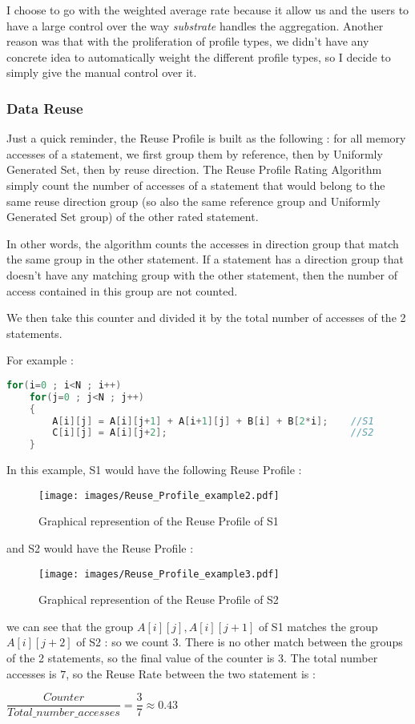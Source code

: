 \documentclass[paper=a4, fontsize=11.5pt]{scrartcl}
\numberwithin{equation}{section}        %
\numberwithin{figure}{section}          %
\numberwithin{table}{section}               %
\begin{document}
    I choose to go with the weighted average rate because it allow us and the users
    to have a large control over the way \textit{substrate} handles the aggregation.
    Another reason was that with the proliferation of profile types, we didn't have
    any concrete idea to automatically weight the different profile types, so I decide
    to simply give the manual control over it.
        \subsubsection{Data Reuse}
            Just a quick reminder, the Reuse Profile is built as the following : for all memory accesses of
            a statement, we first group them by reference, then by Uniformly Generated Set,
            then by reuse direction. The Reuse Profile Rating Algorithm simply count
            the number of accesses of a statement that would belong to the same reuse
            direction group (so also the same reference group and Uniformly Generated Set group)
            of the other rated statement.
            
            In other words, the algorithm counts the accesses in direction group that match
            the same group in the other statement. If a statement has a direction group that doesn't
            have any matching group with the other statement, then the number of access contained
            in this group are not counted.

            We then take this counter and divided it by the total number of accesses of
            the 2 statements.

            For example :
\begin{lstlisting}[frame=single, language=C, caption={Reuse profile rating example}, label={lst:rp_example}]
for(i=0 ; i<N ; i++)
    for(j=0 ; j<N ; j++)
    {
        A[i][j] = A[i][j+1] + A[i+1][j] + B[i] + B[2*i];    //S1
        C[i][j] = A[i][j+2];                                //S2
    }
\end{lstlisting}
        In this example, S1 would have the following Reuse Profile :
\begin{figure}[H]
    \center
    \texttt{[image: images/Reuse\_Profile\_example2.pdf]}
    \caption{Graphical represention of the Reuse Profile of S1}
\end{figure}
            and S2 would have the Reuse Profile :
\begin{figure}[H]
    \center
    \texttt{[image: images/Reuse\_Profile\_example3.pdf]}
    \caption{Graphical represention of the Reuse Profile of S2}
\end{figure}
        we can see that the group ${A[i][j],A[i][j+1]}$ of S1 matches the group ${A[i][j+2]}$
        of S2 : so we count $3$. There is no other match between the groups of the 2 statements,
        so the final value of the counter is $3$. The total number accesses is $7$, so the
        Reuse Rate between the two statement is :
        \begin{center}
            $\dfrac{\mathit{Counter}}{\mathit{Total\_number\_accesses}} = \dfrac{3}{7} \approx 0.43$
        \end{center}
\end{document}

